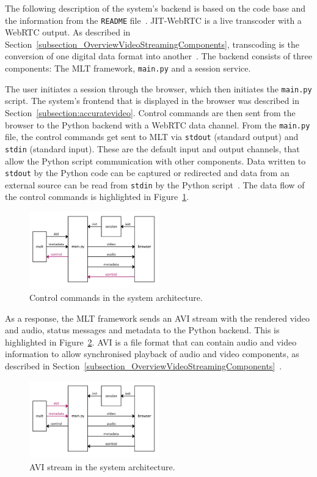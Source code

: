 \documentclass[../MasterThesis.tex]{subfiles}
\begin{document}
The following description of the system's backend is based on the code base and the information from the \texttt{README} file~\cite{RM_Backend}.
JIT-WebRTC is a live transcoder with a WebRTC output. As described in Section~\ref{subsection_OverviewVideoStreamingComponents}, transcoding is the conversion of one digital data format into another~\cite{transcoding}.
The backend consists of three components: The MLT framework, \texttt{main.py} and a session service.


The user initiates a session through the browser, which then initiates the \texttt{main.py} script. The system's frontend that is displayed in the browser was described in Section~\ref{subsection:accuratevideo}.
Control commands are then sent from the browser to the Python backend with a WebRTC data channel.
From the \texttt{main.py} file, the control commands get sent to MLT via \texttt{stdout} (standard output) and \texttt{stdin} (standard input). These are the default input and output channels, that allow the Python script communication with other components.
Data written to \texttt{stdout} by the Python code can be captured or redirected and data from an external source can be read from \texttt{stdin} by the Python script~\cite{python}. The data flow of the control commands is highlighted in Figure~\ref{figure:controlcommands}.

\begin{figure}[H]
	\centering
	\includegraphics[width=0.5\textwidth]{IM_control.png}
	\caption{Control commands in the system architecture.}
	\label{figure:controlcommands}
\end{figure}


As a response, the MLT framework sends an AVI stream with the rendered video and audio, status messages and metadata to the Python backend. This is highlighted in Figure~\ref{figure:avimetadata}.
AVI is a file format that can contain audio and video information to allow synchronised playback of audio and video components, as described in Section~\ref{subsection_OverviewVideoStreamingComponents}~\cite{avi}. 

\begin{figure}[H]
	\centering
	\includegraphics[width=0.5\textwidth]{IM_avi.png}
	\caption{AVI stream in the system architecture.}
	\label{figure:avimetadata}
\end{figure}
\end{document}
